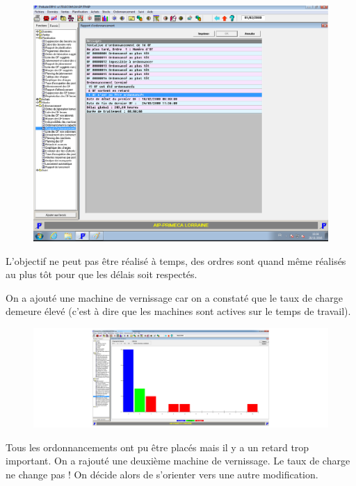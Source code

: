 \documentclass{scrreprt}
\begin{document}
\begin{figure}
   \begin{minipage}[c]{.46\linewidth}
      \includegraphics[scale=0.3]{rapportAuPlusTard.png}
   \end{minipage} \hfill
\end{figure}

L'objectif ne peut pas être réalisé à temps, des ordres sont quand même réalisés au plus tôt pour que les délais soit respectés.

On a ajouté une machine de vernissage car on a constaté que le taux de charge demeure élevé (c'est à dire que les machines sont actives sur le temps de travail).

\begin{figure}
   \begin{minipage}[c]{.46\linewidth}
      \includegraphics[scale=0.3]{1vernisenplus.png}
   \end{minipage} \hfill
\end{figure}

Tous les ordonnancements ont pu être placés mais il y a un retard trop important. On a rajouté une deuxième machine de vernissage. Le taux de charge ne change pas ! On décide alors de s'orienter vers une autre modification. 
\end{document}
